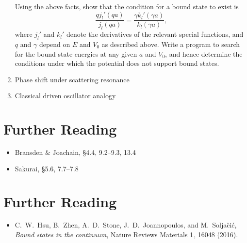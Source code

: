 \documentclass[pra,12pt]{revtex4}
\begin{document}
\begin{enumerate}
  Using the above facts, show that the condition for a bound state to
  exist is
  $$\frac{qj_l'(qa)}{j_l(qa)} = \frac{\gamma k_l'(\gamma a)}{k_l(\gamma a)},$$
  where $j_l'$ and $k_l'$ denote the derivatives of the relevant
  special functions, and $q$ and $\gamma$ depend on $E$ and $V_0$ as
  described above.  Write a program to search for the bound state
  energies at any given $a$ and $V_0$, and hence determine the
  conditions under which the potential does not support bound
  states.



\label{ex:boundstate3d}

\item Phase shift under scattering resonance

\item Classical driven oscillator analogy  
\end{enumerate}




\section*{Further Reading}

\begin{itemize}
\item Bransden \& Joachain, \S4.4, 9.2--9.3, 13.4
\item Sakurai, \S5.6, 7.7--7.8

\end{itemize}

\section*{Further Reading}

\begin{itemize}
\item 
  C.~W.~Hsu, B.~Zhen, A.~D.~Stone, J.~D.~Joannopoulos, and
  M.~Solja\u{c}i\'{c}, \textit{Bound states in the continuum},
  Nature Reviews Materials \textbf{1}, 16048 (2016).
  \label{cite:hsu}
\end{itemize}
\end{document}
